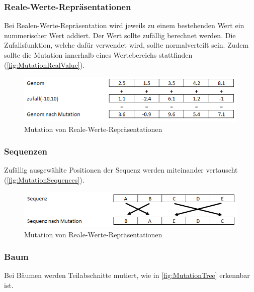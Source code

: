       \subsubsection{Reale-Werte-Repräsentationen}

        Bei Realen-Werte-Repräsentation wird jeweils zu einem bestehenden Wert ein nummerischer Wert addiert.
        Der Wert sollte zufällig berechnet werden.
        Die Zufallsfunktion, welche dafür verwendet wird, sollte normalverteilt sein.
        Zudem sollte die Mutation innerhalb eines Wertebereichs stattfinden (\vref{fig:MutationRealValue}).

        \begin{figure}[H]
          \includegraphics[scale=1,center]{graphics/mutation_real_value}
          \caption{Mutation von Reale-Werte-Repräsentationen\label{fig:MutationRealValue}}
        \end{figure}

      \subsubsection{Sequenzen}

        Zufällig ausgewählte Positionen der Sequenz werden miteinander vertauscht (\vref{fig:MutationSequences}).

        \begin{figure}[H]
            \includegraphics[scale=1,center]{graphics/mutation_sequences}
            \caption{Mutation von Reale-Werte-Repräsentationen\label{fig:MutationSequences}}
        \end{figure}

      \subsubsection{Baum}

        Bei Bäumen werden Teilabschnitte mutiert, wie in \vref{fig:MutationTree} erkennbar ist.


